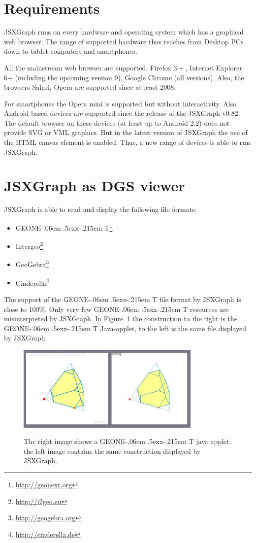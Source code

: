 \documentclass[12pt,a4paper]{article}%
\def\GEONExT{GEONE\kern-.06em \lower.5ex\hbox{x}\kern-.215em T}
\begin{document}
\section{Requirements}
JSXGraph runs on every hardware and operating system which has a graphical 
web browser. The range of supported hardware thus reaches from Desktop PCs 
down to tablet computers and smartphones.

All the mainstream web browser are supported, Firefox $3+$, Internet Explorer
6+ (including the upcoming version 9), Google Chrome (all versions). 
Also, the browsers Safari, Opera are supported since at least 2008. 

For smartphones the Opera mini is supported but without interactivity.
Also Android based devices are supported since the release of the JSXGraph v0.82.
The default browser on these devices (at least up to Android 2.2) does not provide
SVG or VML graphics. But in the latest version of JSXGraph 
the use of the HTML canvas element is enabled. Thus, a new range of devices is 
able to run JSXGraph.


\section{JSXGraph as DGS viewer}
JSXGraph is able to read and display the following file formats:
\begin{itemize} 
\item \GEONExT{}\footnote{\href{http://geonext.org}{http://geonext.org}} 	
	\cite{ehmann2003,ehmann2008}
\item Intergeo\footnote{\href{http://i2geo.eu}{http://i2geo.eu}} \cite{kortenkamp2009}
\item GeoGebra\footnote{\href{geogebra.org}{http://geogebra.org}} \cite{hohenwarter2005}
\item Cinderella\footnote{\href{http://cinderella.de}{http://cinderella.de}} \cite{kortenkamp1999}
\end{itemize}
The support of the \GEONExT{} file format by JSXGraph is close to 100\%. 
Only very few \GEONExT{} resources are misinterpreted by JSXGraph. 
In Figure~\ref{fig:geonext} the construction to the right is the \GEONExT{} Java-applet, to the left is the same file displayed by JSXGraph.
\begin{figure}[ht]
\begin{center}
\includegraphics[width=0.8\textwidth]{geonext.png}\\
\caption{The right image shows a \GEONExT{} java applet, 
the left image contains the same construction displayed 
by JSXGraph.}\label{fig:geonext}
\end{center}
\end{figure}
\end{document}
